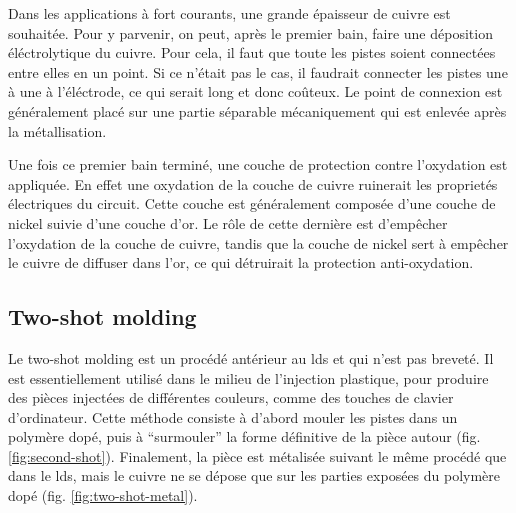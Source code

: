 Dans les applications à fort courants, une grande épaisseur de cuivre est souhaitée.
Pour y parvenir, on peut, après le premier bain, faire une déposition éléctrolytique du cuivre.
Pour cela, il faut que toute les pistes soient connectées entre elles en un point.
Si ce n'était pas le cas, il faudrait connecter les pistes une à une à l'éléctrode, ce qui serait long et donc coûteux.
Le point de connexion est généralement placé sur une partie séparable mécaniquement qui est enlevée après la métallisation.

Une fois ce premier bain terminé, une couche de protection contre l'oxydation est appliquée.
En effet une oxydation de la couche de cuivre ruinerait les proprietés électriques du circuit.
Cette couche est généralement composée d'une couche de nickel suivie d'une couche d'or.
Le rôle de cette dernière est d'empêcher l'oxydation de la couche de cuivre, tandis que la couche de nickel sert à empêcher le cuivre de diffuser dans l'or, ce qui détruirait la protection anti-oxydation.

\subsection{Two-shot molding}
Le two-shot molding est un procédé antérieur au \gls{lds} et qui n'est pas breveté.
Il est essentiellement utilisé dans le milieu de l'injection plastique, pour produire des pièces injectées de différentes couleurs, comme des touches de clavier d'ordinateur.
Cette méthode consiste à d'abord mouler les pistes dans un polymère dopé, puis à ``surmouler'' la forme définitive de la pièce autour (fig. \ref{fig:second-shot}).
Finalement, la pièce est métalisée suivant le même procédé que dans le \gls{lds}, mais le cuivre ne se dépose que sur les parties exposées du polymère dopé (fig. \ref{fig:two-shot-metal}).



